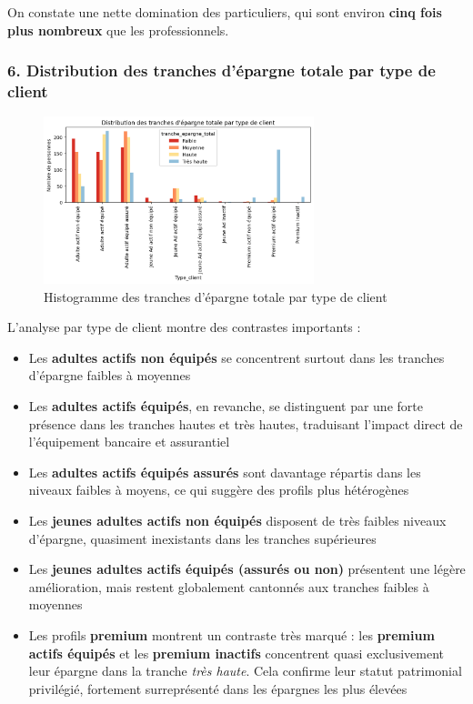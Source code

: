 On constate une nette domination des particuliers, qui sont environ \textbf{cinq fois plus nombreux} que les professionnels.

\subsubsection*{6. Distribution des tranches d'épargne totale par type de client}
\begin{figure}[!h]
    \centering
    \includegraphics[width=0.7\textwidth]{images/py/epargne_total_typeClient.png}
    \caption{Histogramme des tranches d'épargne totale par type de client}
\end{figure}

L'analyse par type de client montre des contrastes importants :  
\begin{itemize}
    \item Les \textbf{adultes actifs non équipés} se concentrent surtout dans les tranches d’épargne faibles à moyennes
    \item Les \textbf{adultes actifs équipés}, en revanche, se distinguent par une forte présence dans les tranches hautes et très hautes, traduisant l'impact direct de l'équipement bancaire et assurantiel
    \item Les \textbf{adultes actifs équipés assurés} sont davantage répartis dans les niveaux faibles à moyens, ce qui suggère des profils plus hétérogènes
    \item Les \textbf{jeunes adultes actifs non équipés} disposent de très faibles niveaux d'épargne, quasiment inexistants dans les tranches supérieures
    \item Les \textbf{jeunes adultes actifs équipés (assurés ou non)} présentent une légère amélioration, mais restent globalement cantonnés aux tranches faibles à moyennes
    \item Les profils \textbf{premium} montrent un contraste très marqué : les \textbf{premium actifs équipés} et les \textbf{premium inactifs} concentrent quasi exclusivement leur épargne dans la tranche \textit{très haute}. Cela confirme leur statut patrimonial privilégié, fortement surreprésenté dans les épargnes les plus élevées
\end{itemize}

